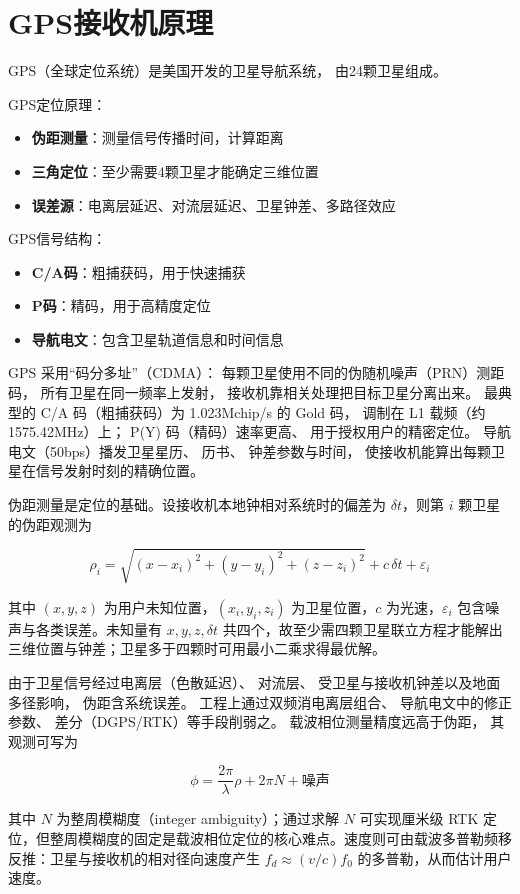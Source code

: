 \section{GPS接收机原理}
\label{sec:gps_principle}

GPS（全球定位系统）是美国开发的卫星导航系统，
由24颗卫星组成。

GPS定位原理：
\begin{itemize}
    \item \textbf{伪距测量}：测量信号传播时间，计算距离
    \item \textbf{三角定位}：至少需要4颗卫星才能确定三维位置
    \item \textbf{误差源}：电离层延迟、对流层延迟、卫星钟差、多路径效应
\end{itemize}

GPS信号结构：
\begin{itemize}
    \item \textbf{C/A码}：粗捕获码，用于快速捕获
    \item \textbf{P码}：精码，用于高精度定位
    \item \textbf{导航电文}：包含卫星轨道信息和时间信息
\end{itemize}

GPS 采用“码分多址”（CDMA）：
每颗卫星使用不同的伪随机噪声（PRN）测距码，
所有卫星在同一频率上发射，
接收机靠相关处理把目标卫星分离出来。
最典型的 C/A 码（粗捕获码）为 1.023Mchip/s 的 Gold 码，
调制在 L1 载频（约 1575.42MHz）上；
P(Y) 码（精码）速率更高、
用于授权用户的精密定位。
导航电文（50bps）播发卫星星历、
历书、
钟差参数与时间，
使接收机能算出每颗卫星在信号发射时刻的精确位置。

伪距测量是定位的基础。设接收机本地钟相对系统时的偏差为 $\delta t$，则第 $i$ 颗卫星的伪距观测为

\[
\rho_i=\sqrt{(x-x_i)^2+(y-y_i)^2+(z-z_i)^2}+c\,\delta t+\varepsilon_i
\]

其中 $(x,y,z)$ 为用户未知位置，$(x_i,y_i,z_i)$ 为卫星位置，$c$ 为光速，$\varepsilon_i$ 包含噪声与各类误差。未知量有 $x,y,z,\delta t$ 共四个，故至少需四颗卫星联立方程才能解出三维位置与钟差；卫星多于四颗时可用最小二乘求得最优解。

由于卫星信号经过电离层（色散延迟）、
对流层、
受卫星与接收机钟差以及地面多径影响，
伪距含系统误差。
工程上通过双频消电离层组合、
导航电文中的修正参数、
差分（DGPS/RTK）等手段削弱之。
载波相位测量精度远高于伪距，
其观测可写为

\[
\phi=\frac{2\pi}{\lambda}\rho+2\pi N+\text{噪声}
\]

其中 $N$ 为整周模糊度（integer ambiguity）；通过求解 $N$ 可实现厘米级 RTK 定位，但整周模糊度的固定是载波相位定位的核心难点。速度则可由载波多普勒频移反推：卫星与接收机的相对径向速度产生 $f_d\approx (v/c)f_0$ 的多普勒，从而估计用户速度。

